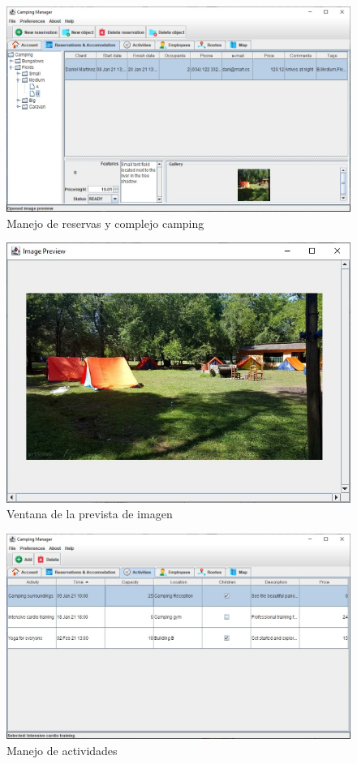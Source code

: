 \documentclass[a4paper]{article}
\begin{document}
\begin{figure}[h]
\includegraphics[width=\textwidth]{img/reservation.jpg}
\caption{Manejo de reservas y complejo camping}
\end{figure}
\begin{figure}[h]
\includegraphics[width=\textwidth]{img/preview.jpg}
\caption{Ventana de la prevista de imagen}
\end{figure}

\begin{figure}[h]
\includegraphics[width=\textwidth]{img/activities.jpg}
\caption{Manejo de actividades}
\end{figure}
\end{document}

